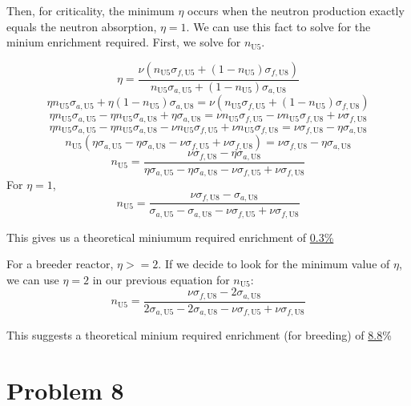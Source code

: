 \documentclass{article}
\begin{document}
Then, for criticality, the minimum $\eta$ occurs when the neutron production exactly equals the neutron absorption, $\eta = 1$. We can use this fact to solve for the minium enrichment required. First, we solve for $n_{\text{U5}}$.

$$ \eta = \frac{\nu (n_{\text{U5}} \sigma_{f,\text{U5}} + (1-n_{\text{U5}}) \sigma_{f,\text{U8}})}{ n_{\text{U5}} \sigma_{a,\text{U5}} + (1-n_{\text{U5}}) \sigma_{a,\text{U8}}} $$
$$ \eta n_{\text{U5}} \sigma_{a,\text{U5}} + \eta (1-n_{\text{U5}}) \sigma_{a,\text{U8}} = \nu (n_{\text{U5}} \sigma_{f,\text{U5}} + (1-n_{\text{U5}}) \sigma_{f,\text{U8}}) $$
$$ \eta n_{\text{U5}} \sigma_{a,\text{U5}} - \eta n_{\text{U5}}\sigma_{a,\text{U8}} + \eta \sigma_{a,\text{U8}} = \nu n_{\text{U5}} \sigma_{f,\text{U5}} -\nu n_{\text{U5}}\sigma_{f,\text{U8}} + \nu\sigma_{f,\text{U8}} $$
$$ \eta n_{\text{U5}} \sigma_{a,\text{U5}} - \eta n_{\text{U5}}\sigma_{a,\text{U8}} - \nu n_{\text{U5}} \sigma_{f,\text{U5}} + \nu n_{\text{U5}}\sigma_{f,\text{U8}} = \nu\sigma_{f,\text{U8}} - \eta \sigma_{a,\text{U8}}$$
$$ n_{\text{U5}}(\eta \sigma_{a,\text{U5}} - \eta \sigma_{a,\text{U8}} - \nu \sigma_{f,\text{U5}} + \nu \sigma_{f,\text{U8}}) = \nu\sigma_{f,\text{U8}} - \eta \sigma_{a,\text{U8}}$$
$$ n_{\text{U5}} = \frac{\nu\sigma_{f,\text{U8}} - \eta \sigma_{a,\text{U8}}}{\eta \sigma_{a,\text{U5}} - \eta \sigma_{a,\text{U8}} - \nu \sigma_{f,\text{U5}} + \nu \sigma_{f,\text{U8}}}$$
For $\eta=1$,
$$ n_{\text{U5}} = \frac{\nu\sigma_{f,\text{U8}} - \sigma_{a,\text{U8}}}{\sigma_{a,\text{U5}} - \sigma_{a,\text{U8}} - \nu \sigma_{f,\text{U5}} + \nu \sigma_{f,\text{U8}}}$$


This gives us a theoretical miniumum required enrichment of \underline{0.3\%}

For a breeder reactor, $\eta>=2$. If we decide to look for the minimum value of $\eta$, we can use $\eta=2$ in our previous equation for $n_{\text{U5}}$:
$$ n_{\text{U5}} = \frac{\nu\sigma_{f,\text{U8}} - 2\sigma_{a,\text{U8}}}{2\sigma_{a,\text{U5}} - 2\sigma_{a,\text{U8}} - \nu \sigma_{f,\text{U5}} + \nu \sigma_{f,\text{U8}}}$$

This suggests a theoretical minium required enrichment (for breeding) of \underline{8.8}\%




\section*{Problem 8}
\end{document}
